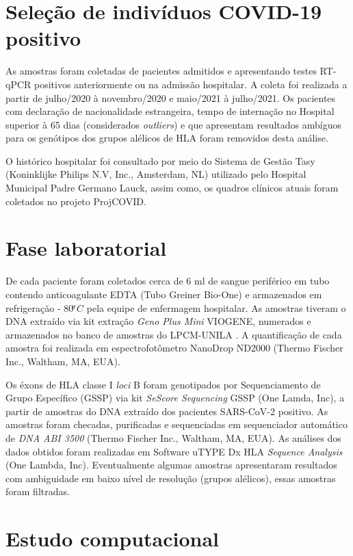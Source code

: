 \begin{justify}
\section{Seleção de indivíduos COVID-19 positivo}

As amostras foram coletadas de pacientes admitidos e apresentando testes RT-qPCR positivos anteriormente ou na admissão hospitalar. A coleta foi realizada a partir de julho/2020 à novembro/2020 e maio/2021 à julho/2021. Os pacientes com declaração de nacionalidade estrangeira, tempo de internação no Hospital superior à 65 dias (considerados \textit{outliers}) e que apresentam resultados ambíguos para os genótipos dos grupos alélicos de HLA foram removidos desta análise. 

O histórico hospitalar foi consultado por meio do Sistema de Gestão Tasy (Koninklijke Philips N.V, Inc., Amsterdam, NL) utilizado pelo Hospital Municipal Padre Germano Lauck, assim como, os quadros clínicos atuais foram coletados no projeto ProjCOVID. 

\section{Fase laboratorial}

De cada paciente foram coletados cerca de 6 ml de sangue periférico em tubo contendo anticoagulante EDTA (Tubo Greiner Bio-One) e armazenados em refrigeração - 80$ ͦ^\circ C$ pela equipe de enfermagem hospitalar. As amostras tiveram o DNA extraído via kit extração \textit{Geno Plus Mini} VIOGENE, numerados e armazenados no banco de amostras do LPCM-UNILA . A quantificação de cada amostra foi realizada em espectrofotômetro NanoDrop ND2000 (Thermo Fischer Inc., Waltham, MA, EUA).

Os éxons de HLA classe I \textit{loci} B foram genotipados por Sequenciamento de Grupo Específico (GSSP) via kit   \textit{SeScore Sequencing}  GSSP (One Lamda, Inc), a partir de amostras do DNA extraído dos pacientes SARS-CoV-2 positivo. As amostras foram checadas, purificadas e sequenciadas em sequenciador automático de \textit{DNA ABI 3500} (Thermo Fischer Inc., Waltham, MA, EUA). As análises dos dados obtidos foram realizadas em Software uTYPE Dx HLA \textit{Sequence Analysis} (One Lambda, Inc). Eventualmente algumas amostras apresentaram resultados com ambiguidade em baixo nível de resolução (grupos alélicos), essas amostras foram filtradas. 

\section{Estudo computacional}


\end{justify}

